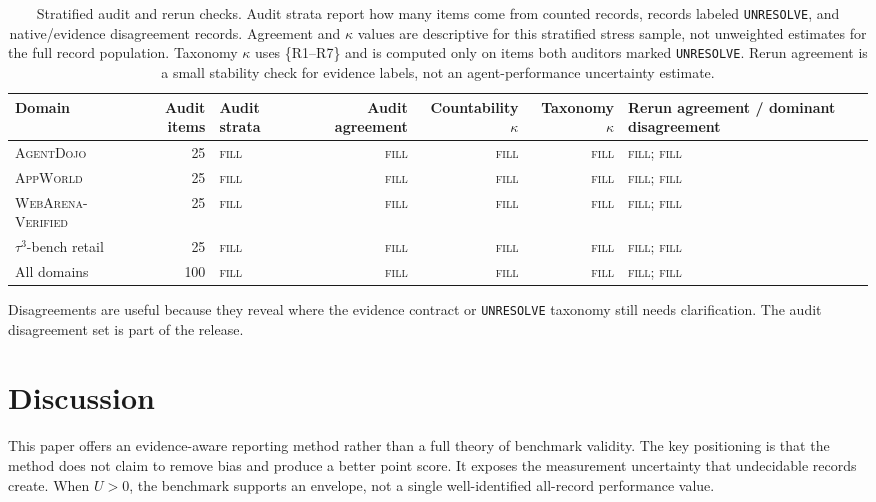 \documentclass{article}
\newcommand{\agentdojo}{\textsc{AgentDojo}\xspace}
\newcommand{\appworld}{\textsc{AppWorld}\xspace}
\newcommand{\webarena}{\textsc{WebArena-Verified}\xspace}
\newcommand{\tauthree}{\(\tau^3\)-bench retail\xspace}
\newcommand{\fillfromdata}{\textsc{fill}}
\providecommand{\ADJAuditStrata}{\fillfromdata}
\providecommand{\ADJAuditAgreement}{\fillfromdata}
\providecommand{\ADJCountabilityKappa}{\fillfromdata}
\providecommand{\ADJTaxonomyKappa}{\fillfromdata}
\providecommand{\ADJRerunAgreement}{\fillfromdata}
\providecommand{\ADJRerunPattern}{\fillfromdata}
\providecommand{\APPAuditStrata}{\fillfromdata}
\providecommand{\APPAuditAgreement}{\fillfromdata}
\providecommand{\APPCountabilityKappa}{\fillfromdata}
\providecommand{\APPTaxonomyKappa}{\fillfromdata}
\providecommand{\APPRerunAgreement}{\fillfromdata}
\providecommand{\APPRerunPattern}{\fillfromdata}
\providecommand{\WAVAuditStrata}{\fillfromdata}
\providecommand{\WAVAuditAgreement}{\fillfromdata}
\providecommand{\WAVCountabilityKappa}{\fillfromdata}
\providecommand{\WAVTaxonomyKappa}{\fillfromdata}
\providecommand{\WAVRerunAgreement}{\fillfromdata}
\providecommand{\WAVRerunPattern}{\fillfromdata}
\providecommand{\TAUAuditStrata}{\fillfromdata}
\providecommand{\TAUAuditAgreement}{\fillfromdata}
\providecommand{\TAUCountabilityKappa}{\fillfromdata}
\providecommand{\TAUTaxonomyKappa}{\fillfromdata}
\providecommand{\TAURerunAgreement}{\fillfromdata}
\providecommand{\TAURerunPattern}{\fillfromdata}
\providecommand{\ALLAuditStrata}{\fillfromdata}
\providecommand{\ALLAuditAgreement}{\fillfromdata}
\providecommand{\ALLCountabilityKappa}{\fillfromdata}
\providecommand{\ALLTaxonomyKappa}{\fillfromdata}
\providecommand{\ALLRerunAgreement}{\fillfromdata}
\providecommand{\ALLRerunPattern}{\fillfromdata}
\begin{document}
\begin{table}[t]
\centering
\caption{Stratified audit and rerun checks. Audit strata report how many items
come from counted records, records labeled \texttt{UNRESOLVE}, and
native/evidence disagreement records. Agreement and \(\kappa\) values are
descriptive for this stratified stress sample, not unweighted estimates for the
full record population. Taxonomy \(\kappa\) uses \{R1--R7\} and is computed
only on items both auditors marked \texttt{UNRESOLVE}. Rerun agreement is a
small stability check for evidence labels, not an agent-performance uncertainty
estimate.}
\label{tab:audit-rerun}
\footnotesize
\setlength{\tabcolsep}{3pt}
\renewcommand{\arraystretch}{1.14}
\begin{tabularx}{\linewidth}{@{}l r l r r r X@{}}
\toprule
Domain & Audit items & Audit strata & Audit agreement & Countability \(\kappa\) & Taxonomy \(\kappa\) & Rerun agreement / dominant disagreement \\
\midrule
\agentdojo & 25 & \ADJAuditStrata & \ADJAuditAgreement & \ADJCountabilityKappa & \ADJTaxonomyKappa & \ADJRerunAgreement; \ADJRerunPattern \\
\appworld & 25 & \APPAuditStrata & \APPAuditAgreement & \APPCountabilityKappa & \APPTaxonomyKappa & \APPRerunAgreement; \APPRerunPattern \\
\webarena & 25 & \WAVAuditStrata & \WAVAuditAgreement & \WAVCountabilityKappa & \WAVTaxonomyKappa & \WAVRerunAgreement; \WAVRerunPattern \\
\tauthree & 25 & \TAUAuditStrata & \TAUAuditAgreement & \TAUCountabilityKappa & \TAUTaxonomyKappa & \TAURerunAgreement; \TAURerunPattern \\
\midrule
All domains & 100 & \ALLAuditStrata & \ALLAuditAgreement & \ALLCountabilityKappa & \ALLTaxonomyKappa & \ALLRerunAgreement; \ALLRerunPattern \\
\bottomrule
\end{tabularx}
\end{table}

Disagreements are useful because they reveal where the evidence contract or
\texttt{UNRESOLVE} taxonomy still needs clarification. The audit disagreement
set is part of the release.

\section{Discussion}
\label{sec:discussion}

This paper offers an evidence-aware reporting method rather than a full theory
of benchmark validity. The key positioning is that the method does not claim to
remove bias and produce a better point score. It exposes the measurement
uncertainty that undecidable records create. When \(U>0\), the benchmark
supports an envelope, not a single well-identified all-record performance
value.
\end{document}
